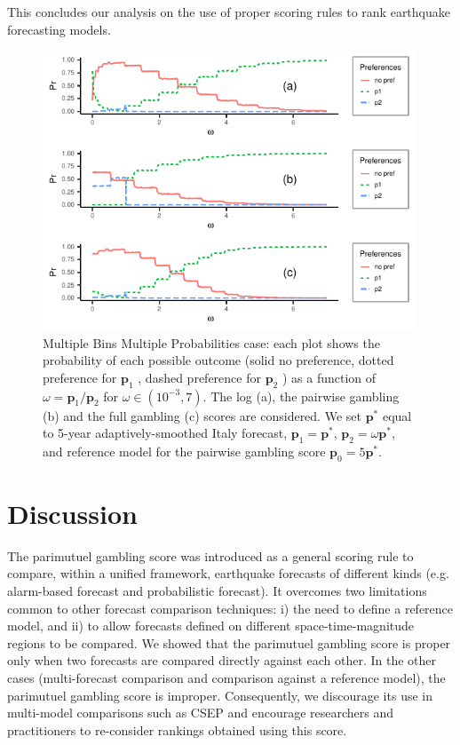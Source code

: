 \documentclass[referee,sn-basic]{sn-jnl}
\theoremstyle{thmstyleone}%
\theoremstyle{thmstyletwo}%
\theoremstyle{thmstylethree}%
\begin{document}
This concludes our analysis on the use of proper scoring rules to rank earthquake forecasting models. 

\begin{figure}
  \includegraphics[width = 0.99\textwidth]{figure12.pdf}
\caption{Multiple Bins Multiple Probabilities case: each plot shows the probability of each possible outcome (solid no preference, dotted preference for $\mathbf p_1$ , dashed preference for $\mathbf p_2$ ) as a function of $\omega = \mathbf p_1/ \mathbf p_2$ for $\omega \in (10^{-3}, 7)$. The log (a), the pairwise gambling (b) and the full gambling (c) scores are considered. We set $\mathbf p^*$ equal to 5-year adaptively-smoothed Italy forecast, $\mathbf p_1 = \mathbf p^*$, $\mathbf p_2 = \omega \mathbf p^*$, and reference model for the pairwise gambling score $\mathbf p_0 = 5\mathbf p^*$.}
\label{fig:12}
\end{figure}

\section{ Discussion }

The parimutuel gambling score was introduced as a general scoring rule to compare, within a unified framework, earthquake forecasts of different kinds (e.g. alarm-based forecast and probabilistic forecast). It overcomes two limitations common to other forecast comparison techniques: i) the need to define a reference model, and  ii) to allow forecasts defined on different space-time-magnitude regions to be compared. We showed that the parimutuel gambling score is proper only when two forecasts are compared directly against each other. In the other cases (multi-forecast comparison and comparison against a reference model), the parimutuel gambling score is improper. Consequently, we discourage its use in multi-model comparisons such as CSEP and encourage researchers and practitioners to re-consider rankings obtained using this score.
\end{document}
